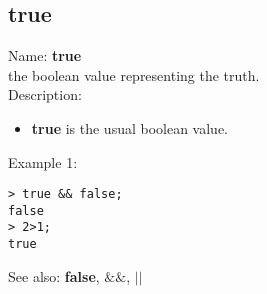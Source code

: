 \subsection{ true }
\noindent Name: \textbf{true}\\
the boolean value representing the truth.\\

\noindent Description: \begin{itemize}

\item \textbf{true} is the usual boolean value.
\end{itemize}
\noindent Example 1: 
\begin{center}\begin{minipage}{15cm}\begin{Verbatim}[frame=single]
> true && false;
false
> 2>1;
true
\end{Verbatim}
\end{minipage}\end{center}
See also: \textbf{false}, \textbf{$\&\&$}, \textbf{$||$}
